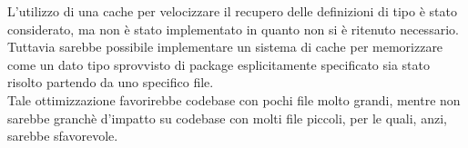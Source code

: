 L'utilizzo di una cache per velocizzare il recupero delle definizioni di tipo è stato considerato,
ma non è stato implementato in quanto non si è ritenuto necessario. Tuttavia sarebbe possibile 
implementare un sistema di cache per memorizzare come un dato tipo sprovvisto di package esplicitamente 
specificato sia stato risolto partendo da uno specifico file. \\

Tale ottimizzazione favorirebbe codebase con pochi file molto grandi, mentre non sarebbe granchè d'impatto 
su codebase con molti file piccoli, per le quali, anzi, sarebbe sfavorevole. \\



